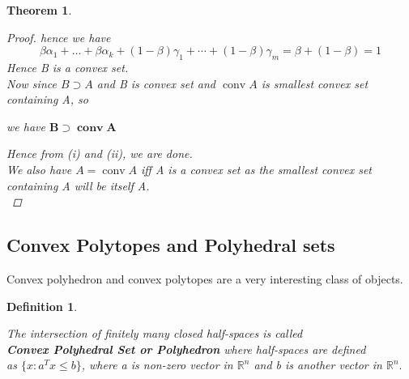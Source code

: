 \documentclass[oneside]{book}
\newtheorem{theorem}{Theorem}[section]
\newtheorem{mydef}{Definition}[section]
\begin{document}
\begin{theorem}
\begin{proof}
			hence we have \\
			$$
			\beta \alpha_{1}+\ldots+\beta \alpha_{k}+(1-\beta) \gamma_{1}+\cdots+(1-\beta) \gamma_{m}=\beta+(1-\beta)=1
			$$
		Hence B is a convex set.\\
		
			Now since $ B \supset A $ and B is convex set and $\operatorname{conv} A $ is smallest convex set containing A, so
			
			we have  $ \mathbf{B} \supset \mathbf{\operatorname{conv} A}  $ \par
			Hence from (i) and (ii), we are done. \\
			We also have $A = \operatorname{conv} A$ iff A is a convex set as the smallest convex set containing A will be itself A. \\
			
		\end{proof}
		
	\end{theorem}
	
	
	
	
	
	
	
	
	
	
	
	
	
	
	
	
	
	
	
	
	
	
	
	
	
	
	
	
	
	
	
	
	
	
	\subsection{ Convex Polytopes and Polyhedral sets } \label{ss:16}
	Convex polyhedron and convex polytopes are a very interesting class of objects. 
	\begin{mydef} \label{d:5}
		
		The intersection of finitely many closed half-spaces is called \\
		\textbf{ Convex Polyhedral Set  or Polyhedron}
		where half-spaces are defined \\
		as $\{ x : a^{T}x \leq b\} $,  where a is non-zero vector in $\mathbb{R}^n$ and b is another vector in  $\mathbb{R}^n.$  
		
		
	\end{mydef}
	
\end{document}
